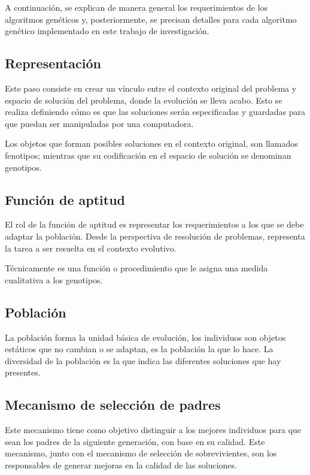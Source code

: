 A continuación, se explican de manera general los requerimientos de los algoritmos genéticos y, posteriormente, se precisan detalles para cada algoritmo genético implementado en este trabajo de investigación.

\subsection{Representación}

Este paso consiste en crear un vínculo entre el contexto original del problema y espacio de solución del problema, donde la evolución se lleva acabo. Esto se realiza definiendo cómo es que las soluciones serán especificadas y guardadas para que puedan ser manipuladas por una computadora.

Los objetos que forman posibles soluciones en el contexto original, son llamados fenotipos; mientras que su codificación en el espacio de solución se denominan genotipos.

\subsection{Función de aptitud}

El rol de la función de aptitud es representar los requerimientos a los que se debe adaptar la población. Desde la perspectiva de resolución de problemas, representa la tarea a ser resuelta en el contexto evolutivo.

Técnicamente  es una función o procedimiento que le asigna una medida cualitativa a los genotipos.

\subsection{Población}

La población forma la unidad básica de evolución, los individuos son objetos estáticos que no cambian o se adaptan, es la población la que lo hace. La diversidad de la población es la que indica las diferentes soluciones que hay presentes.

\subsection{Mecanismo de selección de padres}

Este mecanismo tiene como objetivo distinguir a los mejores individuos para que sean los padres de la siguiente generación, con base en su calidad. Este mecanismo, junto con el mecanismo de selección de sobrevivientes, son los responsables de generar mejoras en la calidad de las soluciones.

